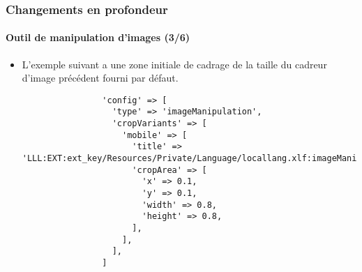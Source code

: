 
\begin{frame}[fragile]
	\frametitle{Changements en profondeur}
	\framesubtitle{Outil de manipulation d'images (3/6)}

	\lstset{basicstyle=\tiny\ttfamily}

	\begin{itemize}

		\item L'exemple suivant a une zone initiale de cadrage de la taille du
		 	cadreur d'image précédent fourni par défaut.

			\begin{lstlisting}
				'config' => [
				  'type' => 'imageManipulation',
				  'cropVariants' => [
				    'mobile' => [
				      'title' => 'LLL:EXT:ext_key/Resources/Private/Language/locallang.xlf:imageManipulation.mobile',
				      'cropArea' => [
				        'x' => 0.1,
				        'y' => 0.1,
				        'width' => 0.8,
				        'height' => 0.8,
				      ],
				    ],
				  ],
				]
			\end{lstlisting}

	\end{itemize}

\end{frame}


